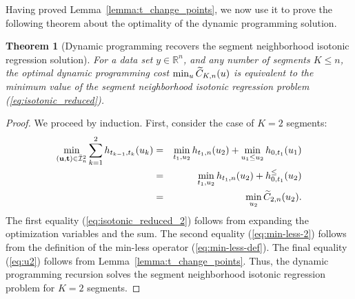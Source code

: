\documentclass{article}
\newtheorem{theorem}{Theorem}
\newcommand{\RR}{\mathbb R}
\begin{document}
Having proved Lemma~\ref{lemma:t_change_points}, we now use it to
prove the following theorem about the optimality of the dynamic
programming solution.
\begin{theorem}[Dynamic programming recovers the segment neighborhood isotonic regression solution]
  For a data set $y\in\RR^n$, and any number of segments $K\leq n$,
  the optimal dynamic programming cost $\min_u \widetilde{C}_{K,n}(u)$ is
  equivalent to the minimum value of the segment neighborhood isotonic
  regression problem (\ref{eq:isotonic_reduced}).
\end{theorem}
\begin{proof}
  We proceed by induction. First, consider the case of $K=2$ segments:
\begin{eqnarray}
  \label{eq:isotonic_reduced_2}
  \min_{(\mathbf u, \mathbf t)\in\bar{\mathcal I}_n^2}
  \sum_{k=1}^2
  h_{t_{k-1}, t_k}(u_k)
  &= &
  \min_{t_1, u_2}
  h_{t_1,n}(u_2)
  +\min_{u_1\leq u_2}
  h_{0,t_1}(u_1)\\
  &=&
      \label{eq:min-less-2}
  \min_{t_1, u_2}
  h_{t_1,n}(u_2)
  +
  h^\leq_{0,t_1}(u_2)\\
  &=&
      \label{eq:u2}
  \min_{u_2} \widetilde{C}_{2, n}(u_2).
\end{eqnarray}
The first equality (\ref{eq:isotonic_reduced_2}) follows from
expanding the optimization variables and the sum. The second equality
(\ref{eq:min-less-2}) follows from the definition of the min-less
operator (\ref{eq:min-less-def}). The final equality (\ref{eq:u2})
follows from Lemma~\ref{lemma:t_change_points}. Thus, the dynamic
programming recursion solves the segment neighborhood isotonic regression
problem for $K=2$ segments.


\end{proof}
\end{document}
